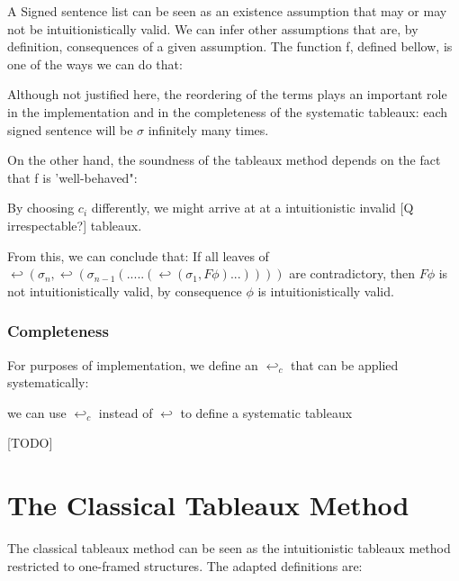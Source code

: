 \documentclass[runningheads]{llncs}
\begin{document}
A Signed sentence list can be seen as an existence assumption that may or may not be intuitionistically valid. We can infer other assumptions that are, by definition, 
consequences of a given assumption. The function f, defined bellow, is one of the ways we can do that: 


\fIntuitionisticDefinition


Although not justified here, the reordering of the terms plays an important role in the implementation and in the completeness of the systematic tableaux: 
each signed sentence will be $\sigma$ infinitely many times.

On the other hand, 
the soundness of the tableaux method depends on the fact that f is 'well-behaved":

\wellBehavedTheorem

By choosing $c_i$ differently, we might arrive at at a intuitionistic invalid [Q irrespectable?] tableaux.   

\TableauxDevelopmentListDefinition

\TableauxDevelopmentExampleFigure

\soundnessTheorem



    From this, we can conclude that: 
        If all leaves of $ \hookleftarrow (\sigma_n,\hookleftarrow(\sigma_{n-1}(.....(\hookleftarrow(\sigma_1 , F\phi)...)))) $ are contradictory, then $F\phi$ is not intuitionistically valid, by consequence 
        $\phi$ is intuitionistically valid. 
        

\subsubsection{Completeness }

For purposes of implementation, we define an $\hookleftarrow_c$ that can be applied systematically: 

\completeiteratordefinition

we can use $\hookleftarrow_c$ instead of $\hookleftarrow$ to define a systematic tableaux

[TODO]

\section{The Classical Tableaux Method}

The classical tableaux method can be seen as the intuitionistic tableaux method restricted to 
one-framed structures. The adapted definitions are: 
\end{document}
